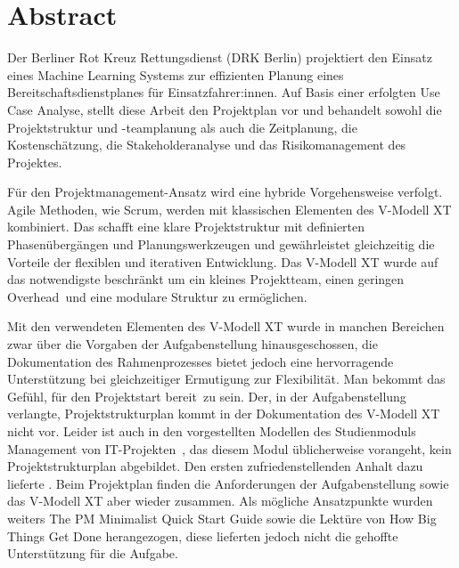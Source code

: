 \chapter{Abstract}

Der Berliner Rot Kreuz Rettungsdienst (DRK Berlin) projektiert den Einsatz eines Machine Learning Systems zur effizienten Planung eines Bereitschaftsdienstplanes für Einsatzfahrer:innen. Auf Basis einer erfolgten Use Case Analyse, stellt diese Arbeit den Projektplan vor und behandelt sowohl die Projektstruktur und -teamplanung als auch die Zeitplanung, die Kostenschätzung, die Stakeholderanalyse und das Risikomanagement des Projektes.

Für den Projektmanagement-Ansatz wird eine hybride Vorgehensweise verfolgt. Agile Methoden, wie Scrum, werden mit klassischen Elementen des V-Modell XT kombiniert. Das schafft eine klare Projektstruktur mit definierten Phasenübergängen und Planungswerkzeugen und gewährleistet gleichzeitig die Vorteile der flexiblen und iterativen Entwicklung. Das V-Modell XT wurde auf das notwendigste beschränkt um ein kleines Projektteam, einen geringen \glqq Overhead\grqq\ und eine modulare Struktur zu ermöglichen.

Mit den verwendeten Elementen des V-Modell XT wurde in manchen Bereichen zwar über die Vorgaben der Aufgabenstellung hinausgeschossen, die Dokumentation des Rahmenprozesses bietet jedoch eine hervorragende Unterstützung bei gleichzeitiger Ermutigung zur Flexibilität. Man bekommt das Gefühl, für den Projektstart \glqq bereit\grqq\ zu sein. Der, in der Aufgabenstellung verlangte, Projektstrukturplan kommt in der Dokumentation des V-Modell XT \citep{angermeier_v-modell-xt_2024} nicht vor. Leider ist auch in den vorgestellten Modellen des Studienmoduls \glqq Management von IT-Projekten\grqq\ \citep{iu_internationale_hochschule_management_2024}, das diesem Modul üblicherweise vorangeht, kein Projektstrukturplan abgebildet. Den ersten zufriedenstellenden Anhalt dazu lieferte \cite{wikipedia_projektstrukturplan_2022}. Beim Projektplan finden die Anforderungen der Aufgabenstellung sowie das V-Modell XT aber wieder zusammen. Als mögliche Ansatzpunkte wurden weiters The PM Minimalist Quick Start Guide \citep{greer_pm_2011} sowie die Lektüre von How Big Things Get Done \citep{flyvbjerg_how_2023} herangezogen, diese lieferten jedoch nicht die gehoffte Unterstützung für die Aufgabe.

